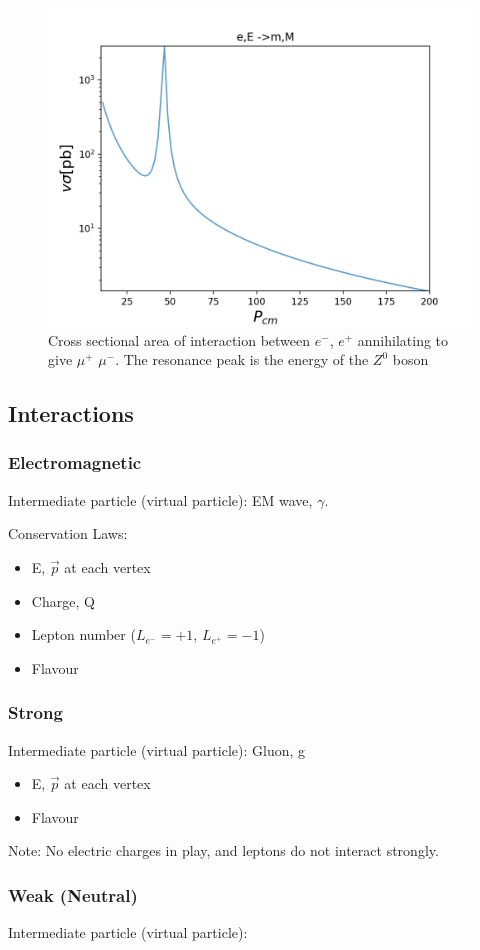 \documentclass[11pt,a4paper]{article}
\begin{document}
\begin{figure}[h]
    \centering
    \includegraphics[width=0.5\linewidth]{Documents/Notes/Fig/eE-mM.png}
    \caption{Cross sectional area of interaction between $e^-$, $e^+$ annihilating to give $\mu^+$ $\mu^-$. The resonance peak is the energy of the $Z^0$ boson}
    \label{fig:enter-label}
\end{figure}

\subsection{Interactions}
\subsubsection{Electromagnetic}
Intermediate particle (virtual particle): EM wave, $\gamma$.

Conservation Laws:
\begin{itemize}
    \item E, $\vec{p}$ at each vertex
    \item Charge, Q
    \item Lepton number ($L_{e^-} = +1$, $L_{e^+} = -1$)
    \item Flavour
\end{itemize}

\subsubsection{Strong}
Intermediate particle (virtual particle): Gluon, g

\begin{itemize}
    \item E, $\vec{p}$ at each vertex
    \item Flavour
\end{itemize}
Note: No electric charges in play, and leptons do not interact strongly.

\subsubsection{Weak (Neutral)}
Intermediate particle (virtual particle):
\end{document}
